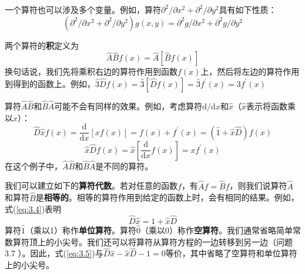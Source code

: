 	一个算符也可以涉及多个变量。例如，算符$\partial^2/\partial x^2+\partial^2/\partial y^2$具有如下性质：
	\begin{equation*}
		\left(\partial^2/\partial x^2+\partial^2/\partial y^2\right)g\left(x,y\right)= \partial^2 g/\partial x^2 + \partial^2 g/\partial y^2
	\end{equation*}

	两个算符的\textbf{积}定义为
	\begin{equation}
		\boxed{
			\hat{A}\hat{B}f\left(x\right) = \hat{A}\left[\hat{B}f\left(x\right)\right]
		}
		\label{eq:3.3 definition of operators' product}
	\end{equation}
	换句话说，我们先将乘积右边的算符作用到函数$f\left(x\right)$上，然后将左边的算符作用到得到的函数上。例如，$\hat{3}\hat{D}f\left(x\right) = \hat{3}\left[\hat{D}f\left(x\right)\right] = \hat{3}f^{\prime}\left(x\right) = 3f^{\prime}\left(x\right)$

	算符$\hat{A}\hat{B}$和$\hat{B}\hat{A}$可能不会有同样的效果。例如，考虑算符$\mathrm{d}/\mathrm{d}x$和$\hat{x}$（$\hat{x}$表示将函数乘以$x$）：
	\begin{equation}
		\hat{D}\hat{x}f\left(x\right)=\frac{\mathrm{d}}{\mathrm{d}x}\left[xf\left(x\right)\right] = f\left(x\right) + f^{\prime}\left(x\right) = \left(\hat{1}+\hat{x}\hat{D}\right)f\left(x\right)
		\label{eq:3.4}
	\end{equation}
	\begin{equation*}
		\hat{x}\hat{D}f\left(x\right) = \hat{x}\left[\frac{\mathrm{d}}{\mathrm{d}x}f\left(x\right)\right] = xf^{\prime}\left(x\right)
	\end{equation*}
	在这个例子中，$\hat{A}\hat{B}$和$\hat{B}\hat{A}$是不同的算符。

	我们可以建立如下的\textbf{算符代数}。若对任意的函数$f$，有$\hat{A}f = \hat{B}f$，则我们说算符$\hat{A}$和算符$\hat{B}$是\textbf{相等的}。相等的算符作用到给定的函数上时，会有相同的结果。例如，式(\ref{eq:3.4})表明
	\begin{equation}
		\hat{D}\hat{x} = 1 + \hat{x}\hat{D}
		\label{eq:3.5}
	\end{equation}
	算符$\hat{1}$（乘以1）称作\textbf{单位算符}。算符$\hat{0}$（乘以0）称作\textbf{空算符}。我们通常省略简单常数算符顶上的小尖号。我们还可以将算符从算符方程的一边转移到另一边（问题 3.7 ）。因此，式(\ref{eq:3.5})与$\hat{D}\hat{x}-\hat{x}\hat{D}-1 = 0$等价，其中省略了空算符和单位算符上的小尖号。

